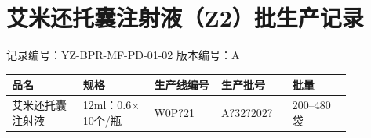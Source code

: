 \documentclass[UTF8,10pt,a4paper,fontset=fandol]{ctexart}
\newcommand{\fieldvalue}[1]{#1}
\newcommand{\handwritten}[1]{#1}
\begin{document}

\newpage

\section*{艾米还托囊注射液（Z2）批生产记录}

\noindent
记录编号：YZ-BPR-MF-PD-01-02 \qquad 版本编号：A

\begin{center}
\begin{tabular}{|p{0.18\linewidth}|p{0.18\linewidth}|p{0.17\linewidth}|p{0.18\linewidth}|p{0.15\linewidth}|}
\hline
品名 & 规格 & 生产线编号 & 生产批号 & 批量\\
\hline
艾米还托囊注射液 & 12ml：0.6$\times$10个/瓶 &
\fieldvalue{\handwritten{W0P?21}} &
\fieldvalue{\handwritten{A?32?202?}} &
200--480袋\\
\hline
\end{tabular}
\end{center}
\end{document}
